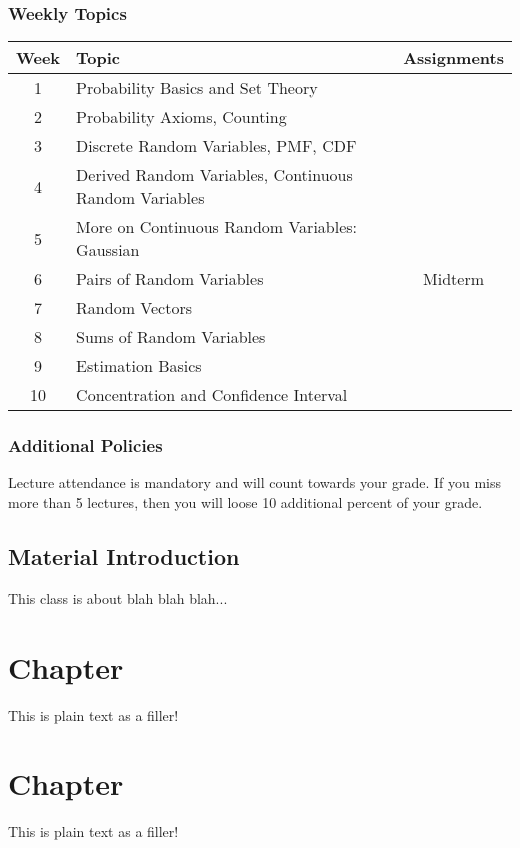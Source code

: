 \documentclass[11pt,fleqn,openany]{book} %
\begin{document}
\subsection{Weekly Topics}
\begin{center}
\begin{tabular}{ |c|l|c| } 
\hline
  Week & Topic & Assignments \\
\hline
  1 & Probability Basics and Set Theory &  \\ 
  2 & Probability Axioms, Counting & \\ 
  3 & Discrete Random Variables, PMF, CDF & \\ 
  4 & Derived Random Variables, Continuous Random Variables & \\ 
  5 & More on Continuous Random Variables: Gaussian & \\ 
  6 & Pairs of Random Variables & Midterm\\ 
  7 & Random Vectors & \\ 
  8 & Sums of Random Variables & \\ 
  9 & Estimation Basics & \\ 
  10 & Concentration and Confidence Interval & \\
\hline
\end{tabular}
\end{center}

\subsection{Additional Policies}
Lecture attendance is mandatory and will count towards your grade. If you miss more than 5 lectures, then you will loose 10 additional percent of your grade.
\section{Material Introduction}
This class is about blah blah blah...

\chapter{Chapter}

This is plain text as a filler!

\chapter{Chapter}

This is plain text as a filler!
\end{document}
